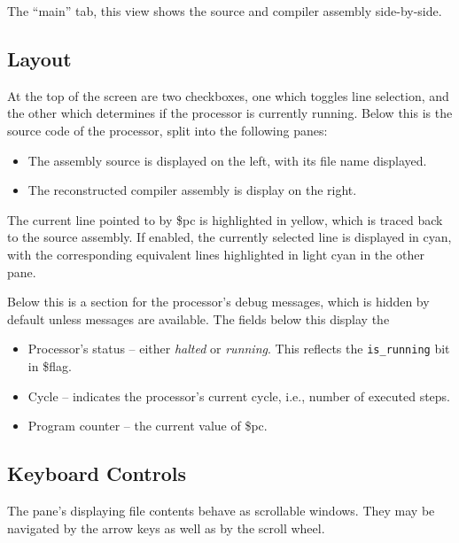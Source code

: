 \documentclass[10pt]{article}
\begin{document}
    The ``main'' tab, this view shows the source and compiler assembly side-by-side.

    \subsection{Layout}

    At the top of the screen are two checkboxes, one which toggles line selection, and the other which determines if the processor is currently running.
    Below this is the source code of the processor, split into the following panes:
    \begin{itemize}
        \item The assembly source is displayed on the left, with its file name displayed.
        \item The reconstructed compiler assembly is display on the right.
    \end{itemize}
    The current line pointed to by \$pc is highlighted in yellow, which is traced back to the source assembly.
    If enabled, the currently selected line is displayed in cyan, with the corresponding equivalent lines highlighted in light cyan in the other pane.

    Below this is a section for the processor's debug messages, which is hidden by default unless messages are available.
    The fields below this display the
    \begin{itemize}
        \item Processor's status -- either \textit{halted} or \textit{running}.
        This reflects the \texttt{is\_running} bit in \$flag.
        \item Cycle -- indicates the processor's current cycle, i.e., number of executed steps.
        \item Program counter -- the current value of \$pc.
    \end{itemize}

    \subsection{Keyboard Controls}

    The pane's displaying file contents behave as scrollable windows.
    They may be navigated by the arrow keys as well as by the scroll wheel.
\end{document}
